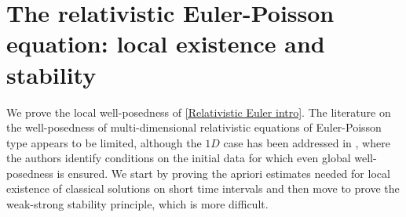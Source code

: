 \documentclass[11pt,reqno]{amsart}
\numberwithin{equation}{section}
\begin{document}
\section{The relativistic Euler-Poisson equation: local existence and stability}\label{local well posedness of relativistic Euler}
We prove the local well-posedness of \eqref{Relativistic Euler intro}. The literature on the well-posedness of multi-dimensional relativistic equations of Euler-Poisson type appears to be limited, although the $1D$ case has been addressed in \cite{rozanova2026sufficient}, where the authors identify conditions on the initial data for which even global well-posedness is ensured. We start by proving the apriori estimates needed for local existence of classical solutions on short time intervals and then move to prove the weak-strong stability principle, which is more difficult.  
\end{document}
